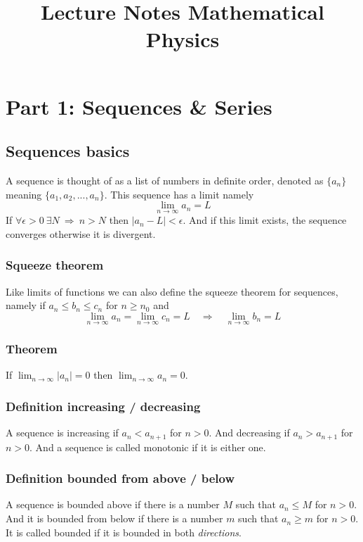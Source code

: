 \documentclass[a4paper]{article}
\title{Lecture Notes Mathematical Physics}
\author{}
\date{}
\begin{document}
\maketitle

\tableofcontents

\section{Part 1: Sequences \& Series}
\subsection{Sequences basics}
A sequence is thought of as a list of numbers in definite order, denoted as $\{a_n\}$ meaning $\{a_1, a_2, ..., a_n\}$. This sequence has a limit namely
\begin{equation}
    \lim_{n\rightarrow\infty} a_n = L
\end{equation}
If $\forall\epsilon>0\ \exists N\ \Rightarrow\  n>N$ then $|a_n-L|<\epsilon$. And if this limit exists, the sequence converges otherwise it is divergent. 
\subsubsection*{Squeeze theorem}
Like limits of functions we can also define the squeeze theorem for sequences, namely if $a_n\le b_n \le c_n$ for $n\ge n_0$ and
\begin{equation}
    \lim_{n\rightarrow\infty} a_n = \lim_{n\rightarrow\infty} c_n = L\quad \Rightarrow\quad \lim_{n\rightarrow\infty} b_n = L
\end{equation}

\subsubsection*{Theorem}
If $\lim_{n\rightarrow\infty} |a_n| = 0$ then $\lim_{n\rightarrow\infty} a_n = 0$.

\subsubsection*{Definition increasing / decreasing}
A sequence is increasing if $a_n<a_{n+1}$ for $n>0$. And decreasing if $a_n>a_{n+1}$ for $n>0$. And a sequence is called monotonic if it is either one.

\subsubsection*{Definition bounded from above / below}
A sequence is bounded above if there is a number $M$ such that $a_n\le M$ for $n>0$. And it is bounded from below if there is a number $m$ such that $a_n\ge m$ for $n>0$. It is called bounded if it is bounded in both \textit{directions}. 
\end{document}
